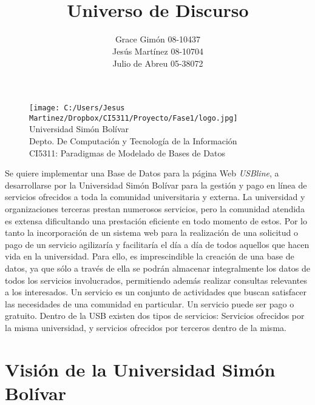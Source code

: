 \documentclass[12pt,a4paper,spanish]{article}
\begin{document}
\begin{figure}
  \centering
    \texttt{[image: C:/Users/Jesus Martinez/Dropbox/CI5311/Proyecto/Fase1/logo.jpg]}
     \\ Universidad Sim\'on Bol\'ivar
     \\ Depto. De Computaci\'on y Tecnolog\'ia de la Informaci\'on
     \\ CI5311: Paradigmas de Modelado de Bases de Datos
\end{figure} 
\title{\\Universo de Discurso}
\author{Grace Gim\'on 08-10437 \\
        Jes\'us Mart\'inez 08-10704\\
        Julio de Abreu 05-38072}        
        
\maketitle

\newpage

\indent Se quiere implementar una Base de Datos para la p\'agina Web
\emph{USBline}, a desarrollarse por la Universidad Sim\'on Bol\'ivar
para la gesti\'on y pago en l\'inea de servicios ofrecidos a toda la
comunidad universitaria y externa.
\newline
\newline
\indent La universidad y organizaciones terceras prestan numerosos servicios, pero la comunidad atendida es extensa
 dificultando una prestaci\'on eficiente en todo momento de estos. Por lo tanto la 
incorporaci\'on de un sistema web para la realizaci\'on de una solicitud o pago de un servicio 
agilizar\'ia y facilitar\'ia el d\'ia a d\'ia de todos aquellos que hacen vida 
en la universidad. Para ello, es imprescindible la creaci\'on de una base de datos, 
ya que s\'olo a trav\'es de ella se podr\'an almacenar integralmente los
datos de todos los servicios involucrados, permitiendo adem\'as realizar consultas relevantes
a los interesados.
\newline
\newline
\indent Un servicio es un conjunto de actividades que buscan
satisfacer las necesidades de una comunidad en particular. Un servicio
puede ser pago o gratuito. Dentro de la USB existen dos tipos de
servicios: Servicios ofrecidos por la misma universidad, y servicios
ofrecidos por terceros dentro de la misma.

\section{Visi\'on de la Universidad Sim\'on Bol\'ivar}
\end{document}

